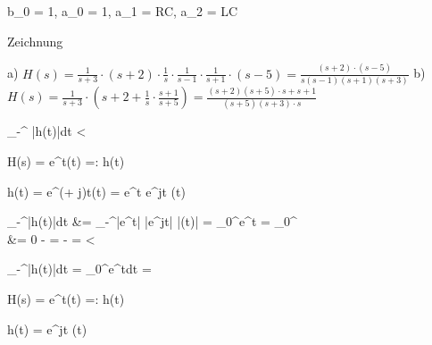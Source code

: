 \begin{abox}
	b_0 = 1, a_0 = 1, a_1 = RC, a_2 = LC
\end{abox}

\begin{abox}
	Zeichnung
\end{abox}


\setcounter{BoxCounter}{289}
\begin{tbox}
	a) $ H(s) = \frac{1}{s+3} \cdot (s+2) \cdot \frac{1}{s} \cdot \frac{1}{s-1} \cdot \frac{1}{s+1} \cdot (s-5) = \frac{(s+2) \cdot (s-5)}{s(s-1)(s+1)(s+3)}$
	b)$ H(s) = \frac{1}{s+3}\cdot \left(s+2+\frac{1}{s}\cdot \frac{s+1}{s+5}\right) = \frac{(s+2)(s+5)\cdot s + s+ 1}{(s+5)(s+3)\cdot s}$
\end{tbox}

\begin{abox}
	\int_{-\infty}^{\infty} \left|h(t)\right|dt < \infty
\end{abox}

\begin{abox}
	H(s) =  \sLaplace e^{\lambda t}\epsilon(t) =: h(t)
\end{abox}

\begin{abox}
	h(t) = e^{(\sigma + j\omega)t}\epsilon(t) = e^{\sigma t} \cdot e^{j\omega t} \cdot \epsilon(t)
\end{abox}

\begin{abox}
	\int_{-\infty}^{\infty}\left|h(t)\right|dt &= \int_{-\infty}^{\infty}\left|e^{\sigma t}\right| \cdot \left|e^{j\omega t}\right| \cdot \left|\epsilon(t)\right| = \int_0^\infty e^{\sigma t} = _0^\infty\\ 
	&= 0 -  = - =  < \infty
\end{abox}

\begin{abox}
	\int_{-\infty}^{\infty}\left|h(t)\right|dt =  \int_0^\infty e^{\sigma t}dt = \infty
\end{abox}

\begin{abox}
	H(s) =  \sLaplace {}e^{\lambda t}\epsilon(t) =: h(t)
\end{abox}

\begin{abox}
	h(t) =  e^{j\omega t} \epsilon(t)
\end{abox}

